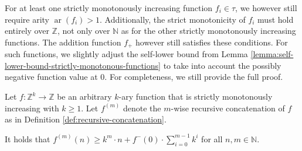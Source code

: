 For at least one strictly monotonously increasing function $f_i\in\tau$, we however still require arity $\operatorname{ar}(f_i)>1$. Additionally, the strict monotonicity of $f_i$ must hold entirely over $\mathbb{Z}$, not only over $\mathbb{N}$ as for the other strictly monotonously increasing functions.
The addition function $f_{+}$ however still satisfies these conditions.
For such functions, we slightly adjust the self-lower bound from Lemma \ref{lemma:self-lower-bound-strictly-monotonous-functions} to take into account the possibly negative function value at $0$.
For completeness, we still provide the full proof.
\begin{lemma}
	\label{lemma:self-lower-bound-strictly-monotonous-functions-integer}
	Let $f:\mathbb{Z}^{k}\to\mathbb{Z}$ be an arbitrary $k$-ary function that is strictly monotonously increasing with $k\geq 1$.
	Let $f^{(m)}$ denote the $m$-wise recursive concatenation of $f$ as in Definition \ref{def:recursive-concatenation}. 
	
	It holds that $f^{(m)}(n)\geq k^m\cdot n + f^{-}(0)\cdot\sum_{i=0}^{m-1}k^i$ for all $n,m\in\mathbb{N}$.
\end{lemma}
